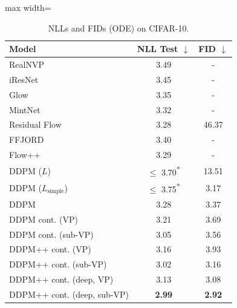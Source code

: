 \documentclass{article} %
\begin{document}
\begin{table}
\begin{minipage}[t]{0.48\textwidth}
\vspace{-0.3cm}
\begin{table}[H]
\centering
\caption{NLLs and FIDs (ODE) on CIFAR-10. }\label{tab:bpd}\vspace{-1em}
\footnotesize
 \setlength\tabcolsep{3.5pt}
\begin{adjustbox}{max width=\textwidth}
    \begin{tabular}{l c c}
    \toprule
    Model & NLL Test $\downarrow$ & FID $\downarrow$\\
    \midrule
    RealNVP~\citep{dinh2016density} & 3.49 & -\\
    iResNet~\citep{behrmann2019invertible} & 3.45 & -\\
    Glow~\citep{kingma2018glow} & 3.35 & - \\
    MintNet~\citep{song2019mintnet} & 3.32 & - \\
    Residual Flow~\citep{chen2019residual} & 3.28 & 46.37\\
    FFJORD~\citep{grathwohl2018ffjord} & 3.40 & -\\
    Flow++~\citep{ho2019flow++} & 3.29 & -\\
    DDPM ($L$)~\citep{ho2020denoising} & $\leq$ 3.70\textsuperscript{*} & 13.51\\
    DDPM ($L_{\text{simple}}$)~\citep{ho2020denoising} & $\leq$ 3.75\textsuperscript{*} & 3.17\\
    \midrule
    DDPM & 3.28 & 3.37\\\relax
    DDPM cont. (VP) & 3.21 & 3.69\\\relax
    DDPM cont. (sub-VP) & 3.05 & 3.56\\\relax
    DDPM++ cont. (VP) & 3.16 & 3.93\\\relax
    DDPM++ cont. (sub-VP) & 3.02 & 3.16\\ \relax
    DDPM++ cont. (deep, VP) & 3.13 & 3.08\\ \relax
    DDPM++ cont. (deep, sub-VP) & \textbf{2.99} & \textbf{2.92} \\
    \bottomrule
    \end{tabular}
\end{adjustbox}
\end{table}
\end{minipage}\hfil
\begin{minipage}[t]{0.48\textwidth}
\vspace{-0.3cm}
\begin{table}[H]

\end{table}
\end{minipage}
\end{table}
\end{document}
